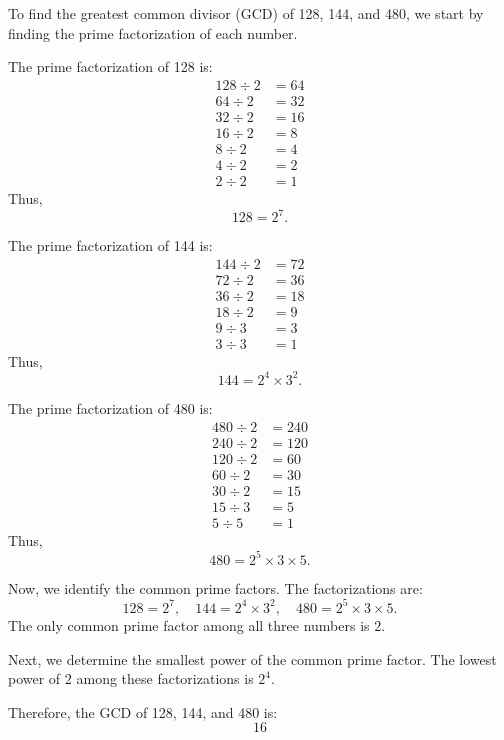 \begin{figure*}[htbp]
    \centering
\begin{tcolorbox}[title=Small Teacher CoT Example, promptstyle]
\lstset{
    basicstyle=\normalfont\sffamily\footnotesize,
    breaklines=true,
    frame=none,
    columns=fullflexible,
}


To find the greatest common divisor (GCD) of 128, 144, and 480, we start by finding the prime factorization of each number.

The prime factorization of 128 is:
\[
\begin{aligned}
128 \div 2 &= 64 \\
64 \div 2 &= 32 \\
32 \div 2 &= 16 \\
16 \div 2 &= 8 \\
8 \div 2 &= 4 \\
4 \div 2 &= 2 \\
2 \div 2 &= 1
\end{aligned}
\]
Thus, 
\[
128 = 2^7.
\]

The prime factorization of 144 is:
\[
\begin{aligned}
144 \div 2 &= 72 \\
72 \div 2 &= 36 \\
36 \div 2 &= 18 \\
18 \div 2 &= 9 \\
9 \div 3 &= 3 \\
3 \div 3 &= 1
\end{aligned}
\]
Thus,
\[
144 = 2^4 \times 3^2.
\]

The prime factorization of 480 is:
\[
\begin{aligned}
480 \div 2 &= 240 \\
240 \div 2 &= 120 \\
120 \div 2 &= 60 \\
60 \div 2 &= 30 \\
30 \div 2 &= 15 \\
15 \div 3 &= 5 \\
5 \div 5 &= 1
\end{aligned}
\]
Thus,
\[
480 = 2^5 \times 3 \times 5.
\]

Now, we identify the common prime factors. The factorizations are:
\[
128 = 2^7, \quad 144 = 2^4 \times 3^2, \quad 480 = 2^5 \times 3 \times 5.
\]
The only common prime factor among all three numbers is \(2\).

Next, we determine the smallest power of the common prime factor. The lowest power of \(2\) among these factorizations is \(2^4\).

Therefore, the GCD of 128, 144, and 480 is:
\[
\boxed{16}
\]

\end{tcolorbox}
    
\end{figure*}







